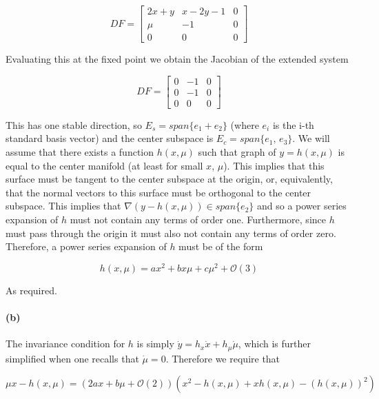 \documentclass{article}
\begin{document}
\begin{equation*}
	DF = 
	\begin{bmatrix}
		2x+y & x-2y-1 & 0 \\ \mu & -1 & 0 \\ 0 & 0 & 0 
	\end{bmatrix}
\end{equation*}

Evaluating this at the fixed point we obtain the Jacobian of the extended system 

\begin{equation*}
	DF = 
	\begin{bmatrix}
		0 & -1 & 0 \\ 0 & -1 & 0 \\ 0 & 0 & 0 
	\end{bmatrix}
\end{equation*}

This has one stable direction, so $E_s = span\{e_1 + e_2\}$ (where $e_i$ is the i-th standard 
basis vector) and the center subspace is $E_c = span\{e_1,\, e_3\}$. We will assume that 
there exists a function $h(x,\mu)$ such that graph of $y = h(x,\mu)$ is equal to the center 
manifold (at least for small $x$, $\mu$). This implies that this surface must be tangent to the 
center subspace at the origin, or, equivalently, that the normal vectors to this surface must 
be orthogonal to the center subspace. This implies that $\nabla(y-h(x,\mu)) \in span\{e_2\}$ 
and so a power series expansion of $h$ must not contain any terms of order one. Furthermore, since 
$h$ must pass through the origin it must also not contain any terms of order zero. Therefore, 
a power series expansion of $h$ must be of the form

\begin{equation*}
	h(x,\mu) = ax^2 + bx\mu + c\mu^2 + \mathcal{O}(3)
\end{equation*}

As required.

\paragraph{(b)}
The invariance condition for $h$ is simply $\dot y = h_x \dot x + h_\mu \dot \mu$, which is 
further simplified when one recalls that $\dot \mu = 0$. Therefore we require that 

\begin{equation*}
	\mu x - h(x,\mu) = (2ax + b\mu + \mathcal{O}(2))(x^2 - h(x,\mu) + xh(x,\mu) - (h(x,\mu))^2)
\end{equation*}
\end{document}
